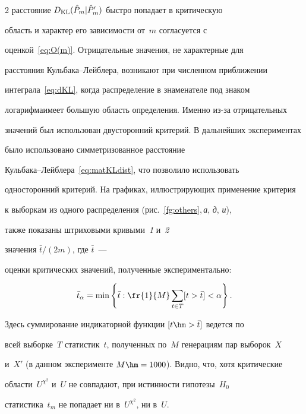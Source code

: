 \begin{multicols}{2}
     расстояние $D_{\mathrm{KL}}(\hat{P}_m | \hat{P}^\prime_m)$ быстро попадает в критическую

     область и характер его зависимости от~$m$ согласуется с

     оценкой~\eqref{eq:O(m)}. Отрицательные значения, не характерные для

     расстояния Куль\-ба\-ка--Лейб\-ле\-ра, возникают при чис\-лен\-ном приближении

     интеграла~\eqref{eq:dKL}, когда распределение в знаменателе под знаком

     логарифма\linebreak имеет большую область определения. Именно из-за отрицательных

     значений был использован двусторонний критерий. В дальнейших экспериментах

     было использовано симметризованное расстояние

     Куль\-ба\-ка--Лейб\-ле\-ра~\eqref{eq:matKLdist}, что позволило использовать

     односторонний критерий. На графиках, иллюстрирующих применение критерия

     к выборкам из одного распределения (рис.~\ref{fg:others},\,\textit{а}, \textit{д}, \textit{и}),

     также показаны штриховыми кривыми~\textit{1} и~\textit{2}

     значения $\bar{t}/(2m)$, где $\bar{t}$~---

     оценки критических значений, полученные экспериментально:

     $$

     \bar{t}_{\alpha} = \min\left\{\bar{t} : \fr{1}{M}\sum\limits_{t\in{T}} [t > \bar{t}]

     < \alpha\right\}.

     $$

      Здесь суммирование индикаторной функции $[t \hm> \bar{t}]$ ведется по

      всей выборке~$T$ статистик~$t$, полученных по~$M$ генерациям пар выборок~$X$

      и~$X'$ (в данном эксперименте $M\hm = 1000$). Видно, что, хотя критические

      области~$U^{\chi^2}$ и~$U$ не совпадают, при истинности гипотезы~$H_0$

      статистика~$t_m$ не попадает ни в~$U^{\chi^2}$, ни в~$U$.






\end{multicols}
